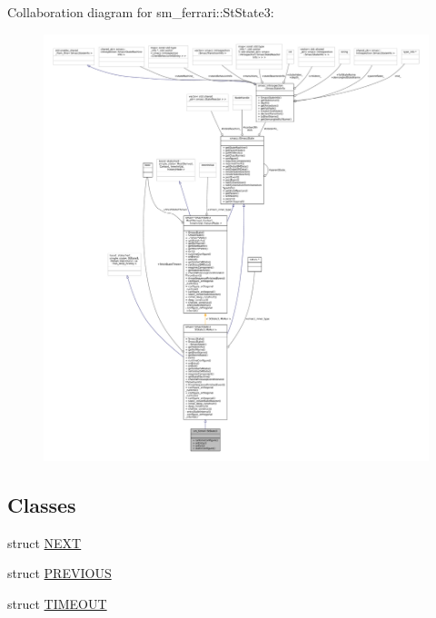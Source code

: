 Collaboration diagram for sm\+\_\+ferrari\+:\+:St\+State3\+:
\nopagebreak
\begin{figure}[H]
\begin{center}
\leavevmode
\includegraphics[width=350pt]{structsm__ferrari_1_1StState3__coll__graph}
\end{center}
\end{figure}
\subsection*{Classes}
\begin{DoxyCompactItemize}
\item 
struct \hyperlink{structsm__ferrari_1_1StState3_1_1NEXT}{N\+E\+XT}
\item 
struct \hyperlink{structsm__ferrari_1_1StState3_1_1PREVIOUS}{P\+R\+E\+V\+I\+O\+US}
\item 
struct \hyperlink{structsm__ferrari_1_1StState3_1_1TIMEOUT}{T\+I\+M\+E\+O\+UT}
\end{DoxyCompactItemize}
